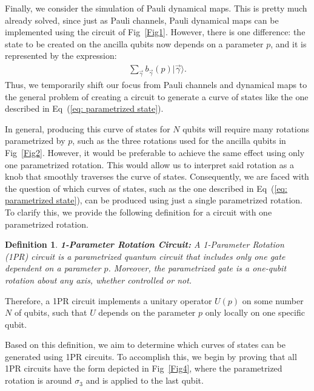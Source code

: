 \documentclass[10pt,letterpaper]{article} %
\newcommand{\fref}[1]{Fig~\ref{#1}}
\newcommand{\eref}[1]{Eq~(\ref{#1})}
\newtheorem{definition}{Definition}
\begin{document}
% 
Finally, we consider the simulation of 
Pauli dynamical maps.
% 
This is pretty much already solved, since
just as Pauli channels, Pauli dynamical maps can be implemented using the circuit
of \fref{Fig1}. However, there is one difference: 
the state to be created on the ancilla qubits now 
depends on a parameter $p$, and it is represented by the expression:
\begin{eqnarray}
\label{eq: parametrized state}
\sum_{\vec{\gamma}} b_{\vec{\gamma}}(p) |\vec{\gamma}\rangle.
\end{eqnarray}
Thus, we temporarily shift our focus from Pauli
channels and dynamical maps to the general problem of 
creating a circuit to generate a curve of
states like the one described in \eref{eq: parametrized state}.

In general, producing this curve of states for $N$ qubits will require
many rotations parametrized by $p$,
such as the three rotations used for the ancilla
qubits in \fref{Fig2}.
However, it would be preferable to achieve the same effect using only one parametrized rotation.
This would allow us to interpret said rotation 
as a knob that smoothly traverses the curve of states.
Consequently, we are faced with the question of which curves of states, 
such as the one described in \eref{eq: parametrized state}, 
can be produced using just a single parametrized rotation. 
To clarify this, we provide the following definition 
for a circuit with one parametrized rotation.

\begin{definition}{\textbf{1-Parameter Rotation Circuit:}}
A 1-Parameter Rotation (1PR) circuit is a parametrized quantum
circuit that includes only one gate dependent on a parameter $p$.
Moreover, the parametrized gate is a one-qubit rotation about any axis,
whether controlled or not.
\end{definition}
%  
Therefore, a 1PR circuit implements a unitary operator $U(p)$ on some number $N$ of qubits,
such that $U$ depends on the parameter $p$ only locally on one specific qubit.

Based on this definition, we aim to determine which curves of 
states can be generated using 1PR circuits. 
To accomplish this, we begin by proving that all 1PR circuits have 
the form depicted in \fref{Fig4},
where the parametrized rotation is around $\sigma_3$ and
is applied to the last qubit.
\end{document}
